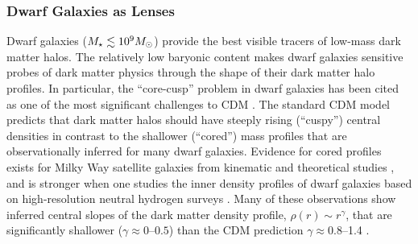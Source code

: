 \subsubsection{Dwarf Galaxies as Lenses }
\label{sec:halo_profile_group}


Dwarf galaxies ($M_\star \lesssim 10^{9} M_\odot$) provide the best visible tracers of low-mass dark matter halos. 
The relatively low baryonic content makes dwarf galaxies sensitive probes of  dark matter physics through the shape of their dark matter halo profiles. 
In particular, the ``core-cusp'' problem in dwarf galaxies has been cited as one of the most significant challenges to CDM \citep[\eg,][]{2010AdAst2010E...5D,Bullock:2017xww}.
The standard CDM model predicts that dark matter halos should have steeply rising (``cuspy'') central densities in contrast to the shallower (``cored'') mass profiles that are observationally inferred for many dwarf galaxies.  
Evidence for cored profiles exists for Milky Way satellite galaxies from kinematic and theoretical studies \citep[\eg][]{Walker:2009, 2012ApJ...759L..42P}, and is stronger when one studies the inner density profiles of dwarf galaxies based on high-resolution neutral hydrogen surveys \citep[\eg][]{Begum:2008,Hunter:2012,Cannon:2011,Oh:2015}. 
Many of these observations show inferred central slopes of the dark matter density profile, $\rho(r) \sim r^{\gamma}$, that are significantly shallower ($\gamma \approx 0$--$0.5$) than the CDM prediction $\gamma \approx 0.8$--1.4 \citep{Navarro:2010}.

